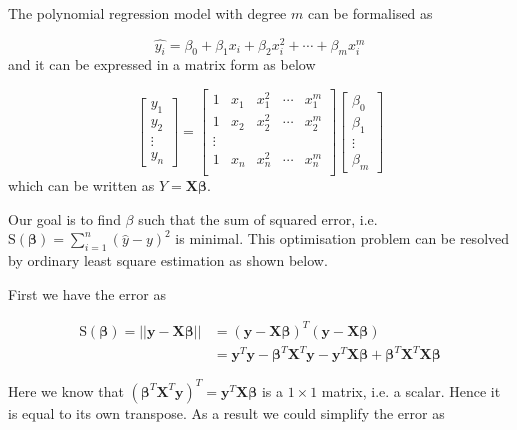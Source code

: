 The polynomial regression model with degree $m$ can be formalised as 

$$ \hat{y_i}= \beta_0+\beta_1x_i+\beta_2x_i^2+\cdots+\beta_mx_i^m$$ and it can be expressed in a matrix form as below

$$
\begin{bmatrix}
y_1 \\ y_2\\ \vdots \\ y_n 
\end{bmatrix}=\begin{bmatrix}
1 & x_1 & x_1^2 &\cdots & x_1^m \\ 
1 & x_2 & x_2^2 &\cdots & x_2^m \\ 
\vdots \\ 
1 & x_n & x_n^2 &\cdots & x_n^m \\ 
\end{bmatrix}\begin{bmatrix}
\beta_0 \\ \beta_1 \\ \vdots \\ \beta_m 
\end{bmatrix}
$$ which can be written as $Y=\boldsymbol{X}\boldsymbol{\beta}$. 
 
 Our goal is to find $\beta$ such that the sum of squared error, i.e. $\text{S}(\boldsymbol{\beta})=\sum_{i=1}^n(\hat{y}-y)^2$ is minimal. This optimisation problem can be resolved by ordinary least square estimation as shown below.
 
 First we have the error as
 
 \begin{equation}
 \begin{split}
 \text{S}(\boldsymbol{\beta})=||\boldsymbol{y}-\boldsymbol{X} \boldsymbol{\beta}||& =(\boldsymbol{y}-\boldsymbol{X}\boldsymbol{\beta})^T(\boldsymbol{y}-\boldsymbol{X}\boldsymbol{\beta})\\
 	& =\boldsymbol{y}^T\boldsymbol{y}-\boldsymbol{\beta}^T\boldsymbol{X}^T\boldsymbol{y}-\boldsymbol{y}^T\boldsymbol{X}\boldsymbol{\beta}+\boldsymbol{\beta}^T\boldsymbol{X}^T\boldsymbol{X}\boldsymbol{\beta}
\end{split}
 \end{equation}
 
 Here we know that $(\boldsymbol{\beta}^T\boldsymbol{X}^T\boldsymbol{y})^T=\boldsymbol{y}^T\boldsymbol{X}\boldsymbol{\beta}$ is a $1\times 1$ matrix, i.e. a scalar. Hence it is equal to its own transpose. As a result we could simplify the error as
 
